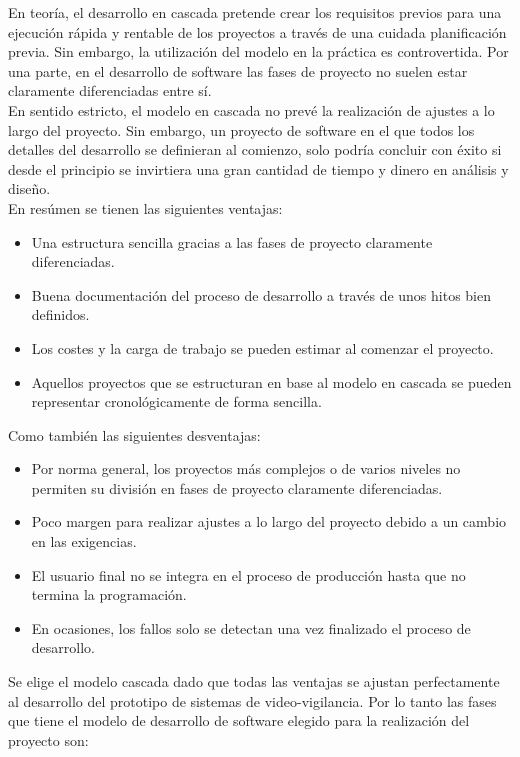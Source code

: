 En teoría, el desarrollo en cascada pretende crear los requisitos previos para una ejecución rápida y rentable de los proyectos a través de una cuidada planificación previa. Sin embargo, la utilización del modelo en la práctica es controvertida. Por una parte, en el desarrollo de software las fases de proyecto no suelen estar claramente diferenciadas entre sí.\\

En sentido estricto, el modelo en cascada no prevé la realización de ajustes a lo largo del proyecto. Sin embargo, un proyecto de software en el que todos los detalles del desarrollo se definieran al comienzo, solo podría concluir con éxito si desde el principio se invirtiera una gran cantidad de tiempo y dinero en análisis y diseño.\\

En resúmen se tienen las siguientes ventajas: 
\begin{itemize}
    \item Una estructura sencilla gracias a las fases de proyecto claramente diferenciadas.
    \item Buena documentación del proceso de desarrollo a través de unos hitos bien definidos.
    \item Los costes y la carga de trabajo se pueden estimar al comenzar el proyecto.
    \item Aquellos proyectos que se estructuran en base al modelo en cascada se pueden representar cronológicamente de forma sencilla.
\end{itemize}

Como también las siguientes desventajas:
\begin{itemize}
    \item  Por norma general, los proyectos más complejos o de varios niveles no permiten su división en fases de proyecto claramente diferenciadas.
    \item Poco margen para realizar ajustes a lo largo del proyecto debido a un cambio en las exigencias.
    \item El usuario final no se integra en el proceso de producción hasta que no termina la programación.
    \item En ocasiones, los fallos solo se detectan una vez finalizado el proceso de desarrollo.
\end{itemize}

Se elige el modelo cascada dado que todas las ventajas se ajustan perfectamente al desarrollo del prototipo de sistemas de video-vigilancia. Por lo tanto las fases que tiene el modelo de desarrollo de software elegido para la realización del proyecto son:

